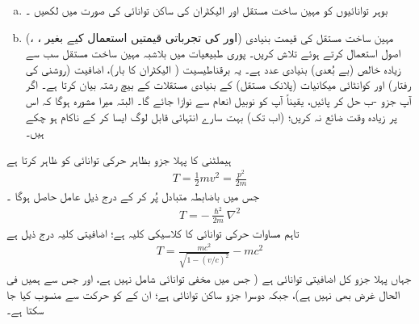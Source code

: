 \begin{enumerate}[a.]
\item
بوہر توانائیوں کو مہین ساخت مستقل اور الیکٹران کی ساکن توانائی  کی صورت میں لکھیں ۔
\item
(، ،  اور  کی تجرباتی قیمتیں  استعمال کیے بغیر)  مہین ساخت مستقل کی قیمت   بنیادی اصول استعمال کرتے ہوئے  تلاش کریں۔  پوری طبیعیات میں  بلاشبہ مہین ساخت مستقل سب سے زیادہ خالص  (بے بُعدی)   بنیادی عدد ہے۔  یہ برقناطیسیت (  الیکٹران کا بار)،  اضافیت  (روشنی کی رفتار)  اور کوانٹائی  میکانیات  (پلانک مستقل) کے بنیادی مستقلات کے بیچ رشتہ بیان کرتا ہے۔  اگر آپ جزو -ب حل کر پائیں،   یقیناً   آپ کو نوبیل انعام سے نوازا جائے گا۔ البتہ میرا مشورہ ہوگا کہ  اس پر زیادہ  وقت ضائع نہ کریں؛   (اب  تک) بہت سارے انتہائی قابل لوگ ایسا  کر کے       ناکام ہو چکے ہیں۔  
\end{enumerate}

ہیملٹنی کا پہلا جزو بظاہر حرکی توانائی کو ظاہر کرتا ہے 
\begin{align}\label{مساوات_غیر_مضطرب_حرکی_توانائی}
T = \frac{1}{2} mv^2 = \frac{p^2}{2m} 
\end{align}
جس میں باضابطہ متبادل  پُر کر کے درج ذیل عامل حاصل ہوگا ۔
\begin{align}
T = - \frac{\hslash^2}{2m} \nabla^2
\end{align} 
تاہم مساوات    حرکی توانائی کا کلاسیکی کلیہ ہے؛  اضافیتی کلیہ درج ذیل ہے
\begin{align}
T = \frac{mc^2}{\sqrt{1 - (v/c)^2}} - mc^2
\end{align}
جہاں پہلا جزو کل اضافیتی  توانائی ہے ( جس میں مخفی توانائی شامل نہیں ہے،  اور جس سے ہمیں فی الحال غرض بھی نہیں ہے)،  جبکہ دوسرا جزو ساکن توانائی ہے؛  ان  کے کو    حرکت سے منسوب کیا جا سکتا ہے۔


